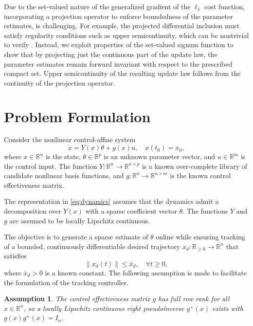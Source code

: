 \documentclass[conference]{ieeeconf}
\newtheorem{assumption}{Assumption}
\begin{document}
Due to the set-valued nature of the generalized gradient of the $\ell_1$ cost function, incorporating a projection operator \cite{SCC.Ioannou.Sun1996, SCC.Ogri.Bell.ea2023} to enforce boundedness of the parameter estimates, is challenging. For example, the projected differential inclusion must satisfy regularity conditions such as upper semicontinuity, which can be nontrivial to verify \cite{SCC.Bressan.Cellina1989}. Instead, we exploit properties of the set-valued signum function to show that by projecting just the continuous part of the update law, the parameter estimates remain forward invariant with respect to the prescribed compact set. Upper semicontinuity of the resulting update law follows from the continuity of the projection operator.

\section{Problem Formulation}\label{sec:problemformulation}
Consider the nonlinear control-affine system 
\begin{equation}\label{eq:dynamics}
    \dot{x} = Y(x)\theta + g(x)u, \quad x(t_{0}) = x_{0},
\end{equation}
where $x \in \mathbb{R}^n$ is the state, $\theta \in \mathbb{R}^{p}$ is an unknown parameter vector, and $u \in \mathbb{R}^m$ is the control input. The function $Y: \mathbb{R}^{n} \to \mathbb{R}^{n \times p}$ is a known over-complete library of candidate nonlinear basis functions, and $g: \mathbb{R}^{n} \to \mathbb{R}^{n \times m}$ is the known control effectiveness matrix. 

The representation in \eqref{eq:dynamics} assumes that the dynamics admit a decomposition over $Y(x)$ with a sparse coefficient vector $\theta$. The functions $Y$ and $g$ are assumed to be locally Lipschitz continuous.

The objective is to generate a sparse estimate of $\theta$ online while ensuring tracking of a bounded, continuously differentiable desired trajectory 
$x_d: \mathbb{R}_{\geq 0} \to \mathbb{R}^n$ that satisfies 
\begin{equation}
    \|x_d(t)\| \le \bar{x}_{d}, \quad \forall t \ge 0,
\end{equation}
where $\bar{x}_{d} > 0$ is a known constant. The following assumption is made to facilitate the formulation of the tracking controller.
\begin{assumption}\label{ass:pseudo}
The control effectiveness matrix $g$ has full row rank for all $x\in \mathbb{R}^n$, so a locally Lipschitz continuous right pseudoinverse $g^+(x)$ exists with $g(x) g^+(x) = I_n$.
\end{assumption}
\end{document}
